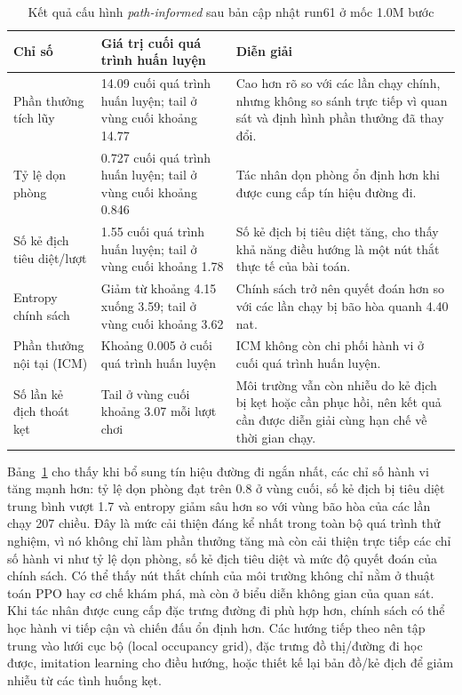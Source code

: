 \begin{table}[H]
    \centering
    \small
    \caption{Kết quả cấu hình \emph{path-informed} sau bản cập nhật run61 ở mốc 1.0M bước}
    \label{tab:run59_bfs_assisted}
    \begin{tabular}{|p{4.1cm}|p{3.2cm}|p{6.4cm}|}
        \hline
        \textbf{Chỉ số} & \textbf{Giá trị cuối quá trình huấn luyện} & \textbf{Diễn giải} \\
        \hline
        Phần thưởng tích lũy & 14.09 cuối quá trình huấn luyện; tail ở vùng cuối khoảng 14.77 & Cao hơn rõ so với các lần chạy chính, nhưng không so sánh trực tiếp vì quan sát và định hình phần thưởng đã thay đổi. \\
        \hline
        Tỷ lệ dọn phòng & 0.727 cuối quá trình huấn luyện; tail ở vùng cuối khoảng 0.846 & Tác nhân dọn phòng ổn định hơn khi được cung cấp tín hiệu đường đi. \\
        \hline
        Số kẻ địch tiêu diệt/lượt & 1.55 cuối quá trình huấn luyện; tail ở vùng cuối khoảng 1.78 & Số kẻ địch bị tiêu diệt tăng, cho thấy khả năng điều hướng là một nút thắt thực tế của bài toán. \\
        \hline
        Entropy chính sách & Giảm từ khoảng 4.15 xuống 3.59; tail ở vùng cuối khoảng 3.62 & Chính sách trở nên quyết đoán hơn so với các lần chạy bị bão hòa quanh 4.40 nat. \\
        \hline
        Phần thưởng nội tại (ICM) & Khoảng 0.005 ở cuối quá trình huấn luyện & ICM không còn chi phối hành vi ở cuối quá trình huấn luyện. \\
        \hline
        Số lần kẻ địch thoát kẹt & Tail ở vùng cuối khoảng 3.07 mỗi lượt chơi & Môi trường vẫn còn nhiễu do kẻ địch bị kẹt hoặc cần phục hồi, nên kết quả cần được diễn giải cùng hạn chế về thời gian chạy. \\
        \hline
    \end{tabular}
\end{table}

Bảng~\ref{tab:run59_bfs_assisted} cho thấy khi bổ sung tín hiệu đường đi ngắn nhất, các chỉ số hành vi tăng mạnh hơn: tỷ lệ dọn phòng đạt trên 0.8 ở vùng cuối, số kẻ địch bị tiêu diệt trung bình vượt 1.7 và entropy giảm sâu hơn so với vùng bão hòa của các lần chạy 207 chiều. Đây là mức cải thiện đáng kể nhất trong toàn bộ quá trình thử nghiệm, vì nó không chỉ làm phần thưởng tăng mà còn cải thiện trực tiếp các chỉ số hành vi như tỷ lệ dọn phòng, số kẻ địch tiêu diệt và mức độ quyết đoán của chính sách. Có thể thấy nút thắt chính của môi trường không chỉ nằm ở thuật toán PPO hay cơ chế khám phá, mà còn ở biểu diễn không gian của quan sát. Khi tác nhân được cung cấp đặc trưng đường đi phù hợp hơn, chính sách có thể học hành vi tiếp cận và chiến đấu ổn định hơn. Các hướng tiếp theo nên tập trung vào lưới cục bộ (local occupancy grid), đặc trưng đồ thị/đường đi học được, imitation learning cho điều hướng, hoặc thiết kế lại bản đồ/kẻ địch để giảm nhiễu từ các tình huống kẹt.

